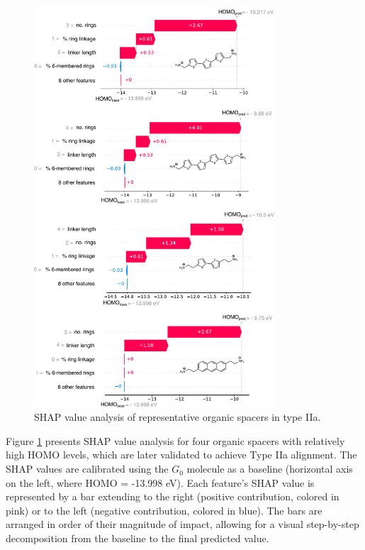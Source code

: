 \begin{figure}[htbp]
    \centering
    \includegraphics[width=0.8\textwidth]{figures/HT-ML/figure4-18.pdf}
    \caption{SHAP value analysis of representative organic spacers in type IIa.}
    \label{fig:figure4.18}
\end{figure}

Figure \ref{fig:figure4.18} presents SHAP value analysis for four organic spacers with relatively high HOMO levels, which are later validated to achieve Type IIa alignment. The SHAP values are calibrated using the $G_0$ molecule as a baseline (horizontal axis on the left, where HOMO = -13.998 eV). Each feature’s SHAP value is represented by a bar extending to the right (positive contribution, colored in pink) or to the left (negative contribution, colored in blue). The bars are arranged in order of their magnitude of impact, allowing for a visual step-by-step decomposition from the baseline to the final predicted value.

